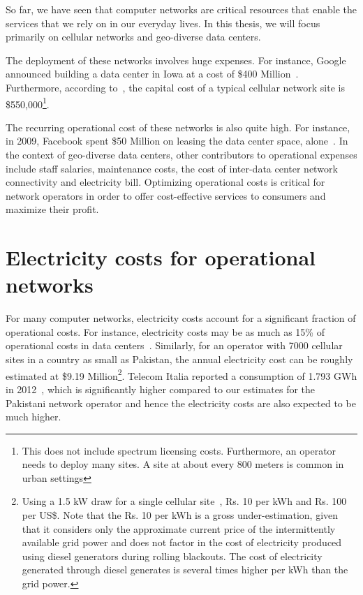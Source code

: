 So far, we have seen that computer networks are critical resources that enable the services that we rely on in our everyday lives. In this thesis, we will focus primarily on cellular networks and geo-diverse data centers. 

The deployment of these networks involves huge expenses. For instance, Google announced building a data center in Iowa at a cost of \$400 Million~\cite{CostOfADC}. Furthermore, according to~\cite{costcellsite}, the capital cost of a typical cellular network site is \$550,000\footnote{This does not include spectrum licensing costs. Furthermore, an operator needs to deploy many sites. A site at about every 800 meters is common in urban settings}. 

The recurring operational cost of these networks is also quite high. For instance, in 2009, Facebook spent \$50 Million on leasing the data center space, alone~\cite{FBLease}. In the context of geo-diverse data centers, other contributors to operational expenses include staff salaries, maintenance costs, the cost of inter-data center network connectivity and electricity bill. Optimizing operational costs is critical for network operators in order to offer cost-effective services to consumers and maximize their profit.

\section{Electricity costs for operational networks} 
For many computer networks, electricity costs account for a significant fraction of operational costs. For instance, electricity costs may be as much as 15\% of operational costs in data centers~\cite{costCloud}. Similarly, for an operator with 7000 cellular sites in a country as small as Pakistan, the annual electricity cost can be roughly estimated at \$9.19 Million\footnote{Using a 1.5 kW draw for a single cellular site~\cite{mbakwe:btshybribpower:2011:necec}, Rs. 10 per kWh and Rs. 100 per US\$. Note that the Rs. 10 per kWh is a gross under-estimation, given that it considers only the approximate current price of the intermittently available grid power and does not factor in the cost of electricity produced using diesel generators during rolling blackouts. The cost of electricity generated through diesel generates is several times higher per kWh than the grid power.}. Telecom Italia reported a consumption of 1.793 GWh in 2012~\cite{TIAnnualReport}, which is significantly higher compared to our estimates for the Pakistani network operator and hence the electricity costs are also expected to be much higher. 

